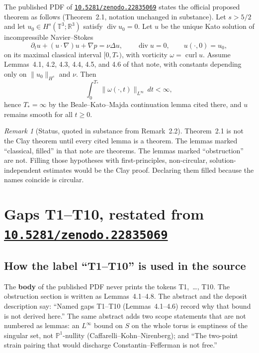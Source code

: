 \documentclass[11pt]{article}
\theoremstyle{plain}
\theoremstyle{definition}
\theoremstyle{remark}
\newtheorem{remark}[theorem]{Remark}
\newcommand{\Tthree}{\mathbb{T}^{3}}
\newcommand{\R}{\mathbb{R}}
\newcommand{\doi}[1]{\href{https://doi.org/#1}{\texttt{#1}}}
\begin{document}
The published PDF of \doi{10.5281/zenodo.22835069} states the official proposed theorem as follows (Theorem~2.1, notation unchanged in substance). Let \(s>5/2\) and let \(u_{0}\in H^{s}(\Tthree;\R^{3})\) satisfy \(\operatorname{div}u_{0}=0\). Let \(u\) be the unique Kato solution of incompressible Navier--Stokes
\[
\partial_{t}u+(u\cdot\nabla)u+\nabla p=\nu\Delta u,\qquad
\operatorname{div}u=0,\qquad u(\cdot,0)=u_{0},
\]
on its maximal classical interval \([0,T_{\ast})\), with vorticity \(\omega=\operatorname{curl}u\). Assume Lemmas~4.1, 4.2, 4.3, 4.4, 4.5, and 4.6 of that note, with constants depending only on \(\|u_{0}\|_{H^{s}}\) and \(\nu\). Then
\[
\int_{0}^{T_{\ast}}\|\omega(\cdot,t)\|_{L^{\infty}}\,dt<\infty,
\]
hence \(T_{\ast}=\infty\) by the Beale--Kato--Majda continuation lemma cited there, and \(u\) remains smooth for all \(t\ge 0\).

\begin{remark}[Status, quoted in substance from Remark~2.2]
Theorem~2.1 is not the Clay theorem until every cited lemma is a theorem. The lemmas marked ``classical, filled'' in that note are theorems. The lemmas marked ``obstruction'' are not. Filling those hypotheses with first-principles, non-circular, solution-independent estimates would be the Clay proof. Declaring them filled because the names coincide is circular.
\end{remark}

\section{Gaps T1--T10, restated from \doi{10.5281/zenodo.22835069}}

\subsection{How the label ``T1--T10'' is used in the source}

The \textbf{body} of the published PDF never prints the tokens T1,~\dots, T10. The obstruction section is written as Lemmas~4.1--4.8. The abstract and the deposit description say: ``Named gaps T1--T10 (Lemmas~4.1--4.6) record why that bound is not derived here.'' The same abstract adds two scope statements that are not numbered as lemmas: an \(L^{\infty}\) bound on \(S\) on the whole torus is emptiness of the singular set, not \(\mathbb{P}^{1}\)-nullity (Caffarelli--Kohn--Nirenberg); and ``The two-point strain pairing that would discharge Constantin--Fefferman is not free.''
\end{document}
